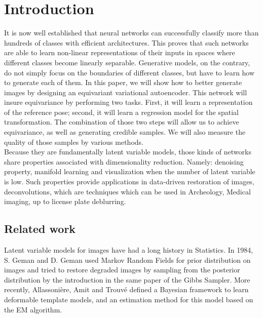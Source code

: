 \documentclass[letterpaper, twoside]{article}
\begin{document}
\newpage




\section*{Introduction}
    
  It is now well established that neural networks can successfully classify more than hundreds of classes with efficient architectures. This proves that such networks are able to learn non-linear representations of their inputs in spaces where different classes become linearly separable. Generative models, on the contrary, do not simply focus on the boundaries of different classes, but have to learn how to generate each of them. In this paper, we will show how to better generate images by designing an equivariant variational autoencoder. This network will insure equivariance by performing two tasks. First, it will learn a representation of the reference pose; second, it will learn a regression model for the spatial transformation. The combination of those two steps will allow us to achieve equivariance, as well as generating credible samples. We will also measure the quality of those samples by various methods.\\

  Because they are fundamentally latent variable models, those kinds of networks share properties associated with dimensionality reduction. Namely: denoising property, manifold learning and visualization when the number of latent variable is low. Such properties provide applications in data-driven restoration of images, deconvolutions, which are techniques which can be used in Archeology, Medical imaging, up to license plate deblurring.

  \subsection*{Related work}
    Latent variable models for images have had a long history in Statistics. In 1984, S. Geman and D. Geman \cite{Geman:1984:SRG:2286442.2286617} used Markov Random Fields for prior distribution on images and tried to restore degraded images by sampling from the posterior distribution by the introduction in the same paper of the Gibbs Sampler. More recently, Allassonière, Amit and Trouvé \cite{Allasson.statfram} defined a Bayesian framework to learn deformable template models, and an estimation method for this model based on the EM algorithm.\\
\end{document}
